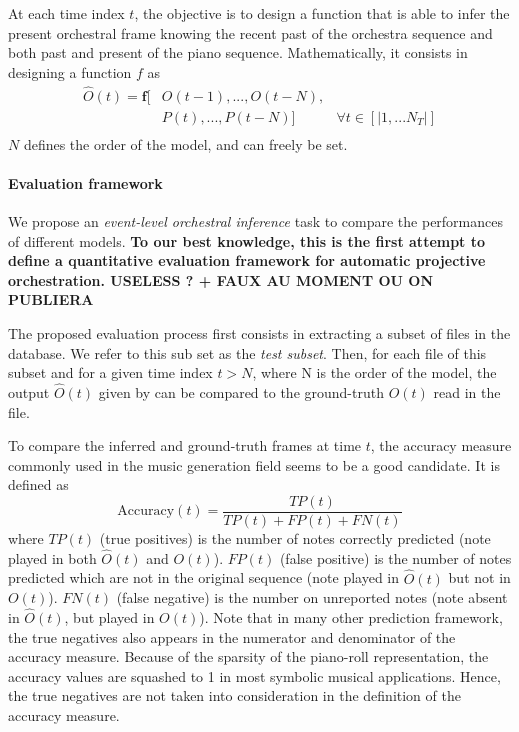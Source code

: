 \documentclass[twoside,twocolumn]{article}
\begin{document}
At each time index $t$, the objective is to design a function that is able to infer the present orchestral frame knowing the recent past of the orchestra sequence and both past and present of the piano sequence. Mathematically, it consists in designing a function $f$ as
\begin{equation}
\begin{aligned}
\hat{O}(t) = \bm{f}\lbrack & O(t-1), ..., O(t-N), & \\
	& P(t), ... ,P(t-N) \rbrack & \forall t \in \left\lbrack|1, ... N_{T}|\right\rbrack\\
\end{aligned}
\label{eq:inference_function}
\end{equation}
$N$ defines the order of the model, and can freely be set.

\paragraph{Evaluation framework}
We propose an \textit{event-level orchestral inference} task to compare the performances of different models. \textbf{To our best knowledge, this is the first attempt to define a quantitative evaluation framework for automatic projective orchestration. USELESS ? + FAUX AU MOMENT OU ON PUBLIERA}

The proposed evaluation process first consists in extracting a subset of files in the database. We refer to this sub set as the \textit{test subset}. Then, for each file of this subset and for a given time index $t > N$, where N is the order of the model, the output $\hat{O}(t)$ given by  can be compared to the ground-truth $O(t)$ read in the file.

To compare the inferred and ground-truth frames at time $t$, the accuracy measure commonly used in the music generation field \cite{DBLP:journals/corr/YaoCVDD15,boulanger2012modeling,lavrenko2003polyphonic} seems to be a good candidate. It is defined as
\begin{equation}
\text{Accuracy}(t)  = \frac{TP(t)}{TP(t) + FP(t) + FN(t)}
\label{eq:accuracy}
\end{equation}
where $TP(t)$ (true positives) is the number of notes correctly predicted (note played in both $\hat{O}(t)$ and $O(t)$). $FP(t)$ (false positive) is the number of notes predicted which are not in the original sequence (note played in $\hat{O}(t)$ but not in $O(t)$). $FN(t)$ (false negative) is the number on unreported notes (note absent in $\hat{O}(t)$, but played in $O(t)$). 
Note that in many other prediction framework, the true negatives also appears in the numerator and denominator of the accuracy measure. Because of the sparsity of the piano-roll representation, the accuracy values are squashed to 1 in most symbolic musical applications. Hence, the true negatives are not taken into consideration in the definition of the accuracy measure.
\end{document}
